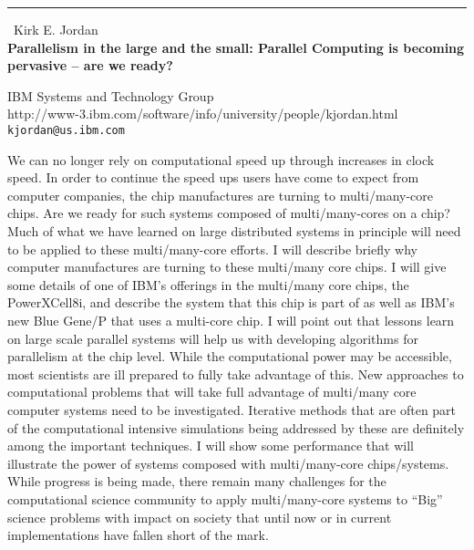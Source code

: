 \documentclass{report}
\begin{document}
\begin{center}
\rule{6in}{1pt} \
{\large Kirk E. Jordan \\
{\bf Parallelism in the large and the small:  Parallel Computing is becoming pervasive – are we ready?}}

IBM Systems and Technology Group \\ 
http://www-3.ibm.com/software/info/university/people/kjordan.html 
\\
{\tt kjordan@us.ibm.com}\end{center}

We can no longer rely on computational speed up through increases in clock speed.  In order to continue the speed ups users have come to expect from computer companies, the chip manufactures are turning to multi/many-core chips.  Are we ready for such systems composed of multi/many-cores on a chip?   Much of what we have learned on large distributed systems in principle will need to be applied to these multi/many-core efforts. I will describe briefly why computer manufactures are turning to these multi/many core chips.  I will give some details of one of IBM’s offerings in the multi/many core chips, the PowerXCell8i, and describe the system that this chip is part of as well as IBM’s new Blue Gene/P that uses a multi-core chip.  I will point out that lessons learn on large scale parallel systems will help us with developing algorithms for parallelism at the chip level.   While the computational power may be accessible, most scientists are ill prepared to fully take advantage of this.  New approaches to computational problems that will take full advantage of multi/many core computer systems need to be investigated.  Iterative methods that are often part of the computational intensive simulations being addressed by these are definitely among the important techniques.  I will show some performance that will illustrate the power of systems composed with multi/many-core chips/systems.  While progress is being made, there remain many challenges for the computational science community to apply multi/many-core systems to “Big” science problems with impact on society that until now or in current implementations have fallen short of the mark.  
\end{document}
